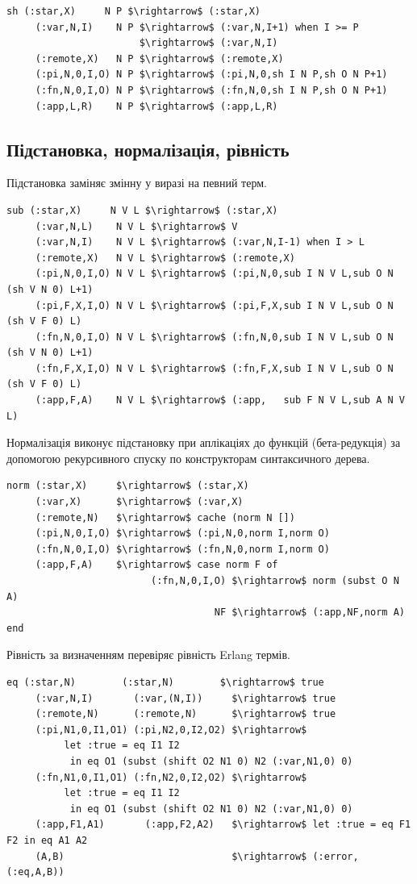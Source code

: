 \begin{lstlisting}[mathescape=true]
  sh (:star,X)     N P $\rightarrow$ (:star,X)
     (:var,N,I)    N P $\rightarrow$ (:var,N,I+1) when I >= P
                       $\rightarrow$ (:var,N,I)
     (:remote,X)   N P $\rightarrow$ (:remote,X)
     (:pi,N,0,I,O) N P $\rightarrow$ (:pi,N,0,sh I N P,sh O N P+1)
     (:fn,N,0,I,O) N P $\rightarrow$ (:fn,N,0,sh I N P,sh O N P+1)
     (:app,L,R)    N P $\rightarrow$ (:app,L,R)
\end{lstlisting}

\subsection{Підстановка, нормалізація, рівність}
Підстановка заміняє змінну у виразі на певний терм.

\begin{lstlisting}[mathescape=true]
 sub (:star,X)     N V L $\rightarrow$ (:star,X)
     (:var,N,L)    N V L $\rightarrow$ V
     (:var,N,I)    N V L $\rightarrow$ (:var,N,I-1) when I > L
     (:remote,X)   N V L $\rightarrow$ (:remote,X)
     (:pi,N,0,I,O) N V L $\rightarrow$ (:pi,N,0,sub I N V L,sub O N (sh V N 0) L+1)
     (:pi,F,X,I,O) N V L $\rightarrow$ (:pi,F,X,sub I N V L,sub O N (sh V F 0) L)
     (:fn,N,0,I,O) N V L $\rightarrow$ (:fn,N,0,sub I N V L,sub O N (sh V N 0) L+1)
     (:fn,F,X,I,O) N V L $\rightarrow$ (:fn,F,X,sub I N V L,sub O N (sh V F 0) L)
     (:app,F,A)    N V L $\rightarrow$ (:app,   sub F N V L,sub A N V L)
\end{lstlisting}

Нормалізація виконує підстановку при аплікаціях до функцій (бета-редукція)
за допомогою рекурсивного спуску по конструкторам синтаксичного дерева.

\begin{lstlisting}[mathescape=true]
norm (:star,X)     $\rightarrow$ (:star,X)
     (:var,X)      $\rightarrow$ (:var,X)
     (:remote,N)   $\rightarrow$ cache (norm N [])
     (:pi,N,0,I,O) $\rightarrow$ (:pi,N,0,norm I,norm O)
     (:fn,N,0,I,O) $\rightarrow$ (:fn,N,0,norm I,norm O)
     (:app,F,A)    $\rightarrow$ case norm F of
                         (:fn,N,0,I,O) $\rightarrow$ norm (subst O N A)
                                    NF $\rightarrow$ (:app,NF,norm A) end
\end{lstlisting}

Рівність за визначенням перевіряє рівність Erlang термів.

\begin{lstlisting}[mathescape=true]
  eq (:star,N)        (:star,N)        $\rightarrow$ true
     (:var,N,I)       (:var,(N,I))     $\rightarrow$ true
     (:remote,N)      (:remote,N)      $\rightarrow$ true
     (:pi,N1,0,I1,O1) (:pi,N2,0,I2,O2) $\rightarrow$
          let :true = eq I1 I2
           in eq O1 (subst (shift O2 N1 0) N2 (:var,N1,0) 0)
     (:fn,N1,0,I1,O1) (:fn,N2,0,I2,O2) $\rightarrow$
          let :true = eq I1 I2
           in eq O1 (subst (shift O2 N1 0) N2 (:var,N1,0) 0)
     (:app,F1,A1)       (:app,F2,A2)   $\rightarrow$ let :true = eq F1 F2 in eq A1 A2
     (A,B)                             $\rightarrow$ (:error,(:eq,A,B))
\end{lstlisting}

